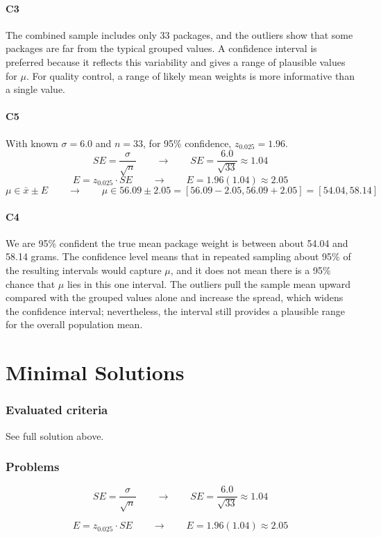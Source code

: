 \begin{ExamProblems}
		\subsection*{C3}
		The combined sample includes only 33 packages, and the outliers show that some packages are far from the typical grouped values. A confidence interval is preferred because it reflects this variability and gives a range of plausible values for $\mu$. For quality control, a range of likely mean weights is more informative than a single value.

		\subsection*{C5}
		With known $\sigma = 6.0$ and $n=33$, for 95\% confidence, $z_{0.025}=1.96$.
		\[
		SE = \frac{\sigma}{\sqrt{n}} \qquad \longrightarrow \qquad SE = \frac{6.0}{\sqrt{33}} \approx 1.04
		\]
		\[
		E = z_{0.025} \cdot SE \qquad \longrightarrow \qquad E = 1.96(1.04) \approx 2.05
		\]
		\[
		\mu \in \bar{x} \pm E \qquad \longrightarrow \qquad \mu \in 56.09 \pm 2.05 = [56.09 - 2.05, 56.09 + 2.05] = [54.04, 58.14]
		\]

		\subsection*{C4}
		We are 95\% confident the true mean package weight is between about 54.04 and 58.14 grams. The confidence level means that in repeated sampling about 95\% of the resulting intervals would capture $\mu$, and it does not mean there is a 95\% chance that $\mu$ lies in this one interval. The outliers pull the sample mean upward compared with the grouped values alone and increase the spread, which widens the confidence interval; nevertheless, the interval still provides a plausible range for the overall population mean.
	\end{ExamProblems}


\part{Minimal Solutions}

\section*{Evaluated criteria}
See full solution above.

\section*{Problems}
\[SE = \frac{\sigma}{\sqrt{n}} \qquad \longrightarrow \qquad SE = \frac{6.0}{\sqrt{33}} \approx 1.04\]

\[E = z_{0.025} \cdot SE \qquad \longrightarrow \qquad E = 1.96(1.04) \approx 2.05\]


